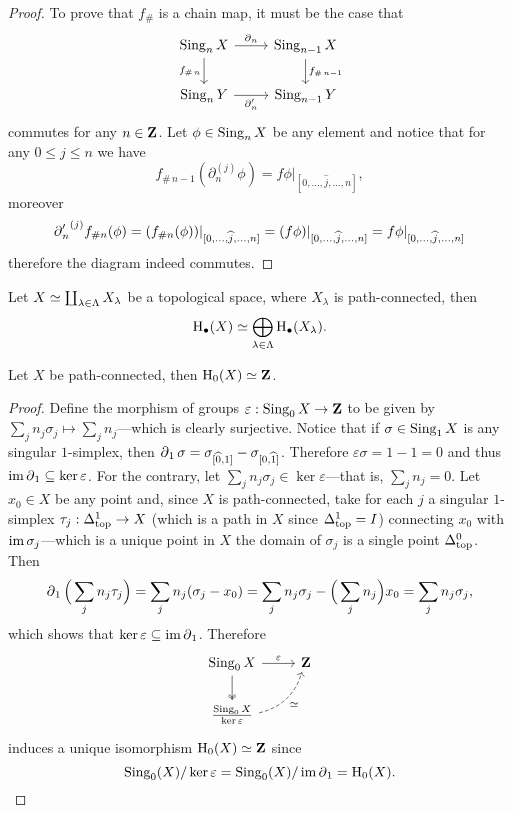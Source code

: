 \begin{proof}
To prove that \(f_{\#}\) is a chain map, it must be the case that
\[
\begin{tikzcd}
\Sing_n X \ar[d, "f_{\#\, n}"'] \ar[r, "\face_n"]
&\Sing_{n-1} X \ar[d, "f_{\#\, n-1}"]
\\
\Sing_n Y \ar[r, "\face_n'"']
&\Sing_{n-1} Y
\end{tikzcd}
\]
commutes for any \(n \in \mathbf{Z}\). Let \(\phi \in \operatorname{Sing}_n X\) be any element and
notice that for any \(0 \leq j \leq n\) we have
\[
f_{\#\, n-1}(\partial_n^{(j)} \phi)
= f \phi|_{[0, \dots, \widehat j, \dots, n]},
\]
moreover
\[
{\operatorname{\partial}_n'}^{(j)} f_{\# n}(\phi)
= (f_{\# n} (\phi))|_{[0, \dots, \widehat j, \dots, n]}
= (f \phi)|_{[0, \dots, \widehat j, \dots, n]}
= f \phi|_{[0, \dots, \widehat j, \dots, n]}
\]
therefore the diagram indeed commutes.
\end{proof}

\begin{proposition}
\label{prop:coprod-space-decomposition-homology-group}
Let \(X \simeq \coprod_{\lambda \in \Lambda} X_{\lambda}\) be a topological
space, where \(X_{\lambda}\) is path-connected, then
\[
\operatorname{H}_{\bullet}(X) \simeq \bigoplus_{\lambda \in \Lambda} \operatorname{H}_{\bullet}(X_{\lambda}).
\]
\end{proposition}

\begin{proposition}
\label{prop:path-connected-homology0-is-Z}
Let \(X\) be path-connected, then \(\operatorname{H}_0(X) \simeq \mathbf{Z}\).
\end{proposition}

\begin{proof}
Define the morphism of groups \(\varepsilon: \operatorname{Sing}_0 X \to \mathbf{Z}\) to be given by
\(\sum_j n_j \sigma_j \mapsto \sum_j n_j\)---which is clearly surjective. Notice
that if \(\sigma \in \operatorname{Sing}_1 X\) is any singular \(1\)-simplex, then
\(\operatorname{\partial}_1 \sigma = \sigma_{[\widehat 0, 1]} - \sigma_{[0, \widehat
  1]}\). Therefore \(\varepsilon \sigma = 1 - 1 = 0\) and thus
\(\operatorname{im} \operatorname{\partial}_1 \subseteq \ker \varepsilon\). For the contrary, let
\(\sum_j n_j \sigma_j \in \ker \varepsilon\)---that is, \(\sum_j n_j = 0\). Let
\(x_0 \in X\) be any point and, since \(X\) is path-connected, take for each
\(j\) a singular \(1\)-simplex \(\tau_j: \Delta_{\text{top}}^1 \to X\) (which is a path in
\(X\) since \(\Delta_{\text{top}}^1 = I\)) connecting \(x_0\) with \(\operatorname{im} \sigma_j\)---which
is a unique point in \(X\) the domain of \(\sigma_j\) is a single point
\(\Delta_{\text{top}}^0\). Then
\[
\operatorname{\partial}_1 \Big( \sum_j n_j \tau_j \Big) = \sum_j n_j (\sigma_j - x_0)
= \sum_j n_j \sigma_j - \Big(\sum_j n_j\Big) x_0
= \sum_j n_j \sigma_j,
\]
which shows that \(\ker \varepsilon \subseteq \operatorname{im} \operatorname{\partial}_1\). Therefore
\[
\begin{tikzcd}
\Sing_0 X \ar[r, "\varepsilon"] \ar[d, two heads]
&\Z \\
\frac{\Sing_0 X}{\ker \varepsilon}
\ar[ru, dashed, "\dis"', bend right] &
\end{tikzcd}
\]
induces a unique isomorphism \(\operatorname{H}_0(X) \simeq \mathbf{Z}\) since
\[
\operatorname{Sing}_0(X)/\ker\varepsilon = \operatorname{Sing}_0(X)/\operatorname{im} \operatorname{\partial}_1 = \operatorname{H}_0(X).
\]
\end{proof}

